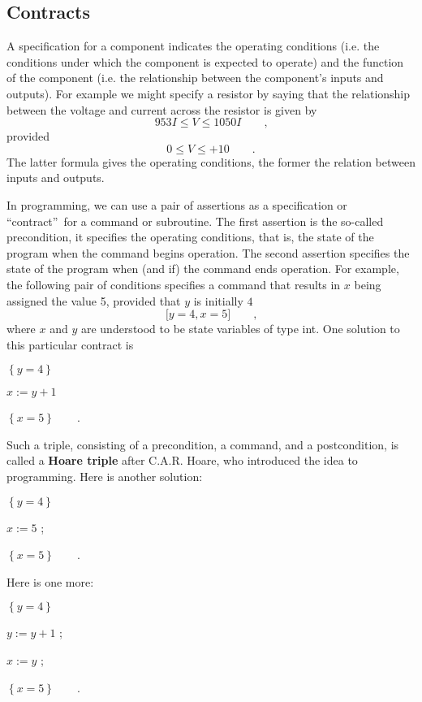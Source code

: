 \documentclass[muchmore,11pt]{article}%
\begin{document}
\subsection{Contracts}

A specification for a component indicates the operating conditions (i.e. the
conditions under which the component is expected to operate) and the function
of the component (i.e. the relationship between the component's inputs and
outputs). For example we might specify a resistor by saying that the
relationship between the voltage and current across the resistor is given by%
\[
953I\leq V\leq1050I\qquad\text{,}%
\]
provided%
\[
0\leq V\leq+10\qquad\text{.}%
\]
The latter formula gives the operating conditions, the former the relation
between inputs and outputs.

In programming, we can use a pair of assertions as a specification or
\textquotedblleft contract\textquotedblright\ for a command or subroutine. The
first assertion is the so-called precondition, it specifies the operating
conditions, that is, the state of the program when the command begins
operation. The second assertion specifies the state of the program when (and
if) the command ends operation. For example, the following pair of conditions
specifies a command that results in $x$ being assigned the value 5, provided
that $y$ is initially $4$%
\[
\lbrack y=4,x=5]\qquad\text{,}%
\]
where $x$ and $y$ are understood to be state variables of type \textsf{int}.
One solution to this particular contract is

\begin{code}
$\left\{  y=4\right\}  $

$x:=y+1$

$\left\{  x=5\right\}  \qquad$.
\end{code}

\noindent Such a triple, consisting of a precondition, a command, and a
postcondition, is called a \textbf{Hoare triple} after C.A.R. Hoare, who
introduced the idea to programming. Here is another solution:

\begin{code}
$\left\{  y=4\right\}  $

$x:=5$ ;

$\left\{  x=5\right\}  \qquad$.
\end{code}

\noindent Here is one more:

\begin{code}
$\left\{  y=4\right\}  $

$y:=y+1$ ;

$x:=y$ ;

$\left\{  x=5\right\}  \qquad$.
\end{code}
\end{document}

